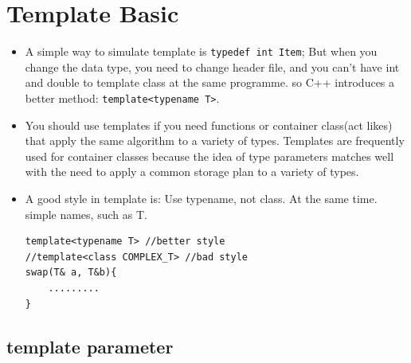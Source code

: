 \documentclass[a4paper,11pt,twoside]{book}
\begin{document}
\section{Template Basic}
\begin{itemize}
\item A simple way to simulate template is \verb=typedef int Item=; But when you change the data type, you need to change header file, and you can't have int and double to template class at the same programme. so C++ introduces a better method: \texttt{template<typename T>}.

\item You should use templates if you need functions or container class(act likes) that apply the same algorithm to a variety of types. Templates are frequently used for container classes because the idea of type parameters matches well with the need to apply a common storage plan to a variety of types.

\item A good style in template is: Use typename, not class. At the same time. simple names, such as T.
\begin{lstlisting}[numbers=none]
template<typename T> //better style
//template<class COMPLEX_T> //bad style
swap(T& a, T&b){
	.........
}
\end{lstlisting}

\end{itemize}

\subsection{template parameter}
\end{document}

